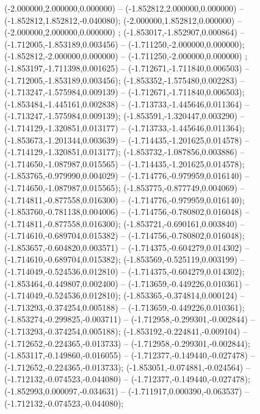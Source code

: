  (-2.000000,2.000000,0.000000) -- (-1.852812,2.000000,0.000000) -- (-1.852812,1.852812,-0.040080);
 (-2.000000,1.852812,0.000000) -- (-2.000000,2.000000,0.000000) ;
 (-1.853017,-1.852907,0.000864) -- (-1.712005,-1.853189,0.003456) -- (-1.711250,-2.000000,0.000000);
 (-1.852812,-2.000000,0.000000) -- (-1.711250,-2.000000,0.000000) ;
 (-1.853197,-1.711398,0.001625) -- (-1.712671,-1.711840,0.006503) -- (-1.712005,-1.853189,0.003456);
 (-1.853352,-1.575480,0.002283) -- (-1.713247,-1.575984,0.009139) -- (-1.712671,-1.711840,0.006503);
 (-1.853484,-1.445161,0.002838) -- (-1.713733,-1.445646,0.011364) -- (-1.713247,-1.575984,0.009139);
 (-1.853591,-1.320447,0.003290) -- (-1.714129,-1.320851,0.013177) -- (-1.713733,-1.445646,0.011364);
 (-1.853673,-1.201344,0.003639) -- (-1.714435,-1.201625,0.014578) -- (-1.714129,-1.320851,0.013177);
 (-1.853732,-1.087856,0.003886) -- (-1.714650,-1.087987,0.015565) -- (-1.714435,-1.201625,0.014578);
 (-1.853765,-0.979990,0.004029) -- (-1.714776,-0.979959,0.016140) -- (-1.714650,-1.087987,0.015565);
 (-1.853775,-0.877749,0.004069) -- (-1.714811,-0.877558,0.016300) -- (-1.714776,-0.979959,0.016140);
 (-1.853760,-0.781138,0.004006) -- (-1.714756,-0.780802,0.016048) -- (-1.714811,-0.877558,0.016300);
 (-1.853721,-0.690161,0.003840) -- (-1.714610,-0.689704,0.015382) -- (-1.714756,-0.780802,0.016048);
 (-1.853657,-0.604820,0.003571) -- (-1.714375,-0.604279,0.014302) -- (-1.714610,-0.689704,0.015382);
 (-1.853569,-0.525119,0.003199) -- (-1.714049,-0.524536,0.012810) -- (-1.714375,-0.604279,0.014302);
 (-1.853464,-0.449807,0.002400) -- (-1.713659,-0.449226,0.010361) -- (-1.714049,-0.524536,0.012810);
 (-1.853365,-0.374814,0.000124) -- (-1.713293,-0.374254,0.005188) -- (-1.713659,-0.449226,0.010361);
 (-1.853274,-0.299825,-0.003711) -- (-1.712958,-0.299301,-0.002844) -- (-1.713293,-0.374254,0.005188);
 (-1.853192,-0.224841,-0.009104) -- (-1.712652,-0.224365,-0.013733) -- (-1.712958,-0.299301,-0.002844);
 (-1.853117,-0.149860,-0.016055) -- (-1.712377,-0.149440,-0.027478) -- (-1.712652,-0.224365,-0.013733);
 (-1.853051,-0.074881,-0.024564) -- (-1.712132,-0.074523,-0.044080) -- (-1.712377,-0.149440,-0.027478);
 (-1.852993,0.000097,-0.034631) -- (-1.711917,0.000390,-0.063537) -- (-1.712132,-0.074523,-0.044080);
